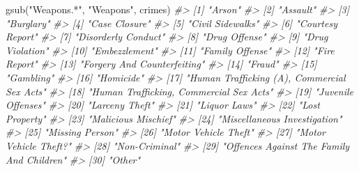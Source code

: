 \documentclass[
  12pt,
]{book}
\newenvironment{Shaded}{\begin{snugshade}}{\end{snugshade}}
\newcommand{\CommentTok}[1]{\textcolor[rgb]{0.37,0.37,0.37}{\textit{#1}}}
\newcommand{\FunctionTok}[1]{\textcolor[rgb]{0,0,0}{#1}}
\newcommand{\NormalTok}[1]{#1}
\newcommand{\StringTok}[1]{\textcolor[rgb]{0.5,0.5,0.5}{#1}}
\begin{document}
\begin{Shaded}
\begin{Highlighting}[]
\FunctionTok{gsub}\NormalTok{(}\StringTok{"Weapons.*"}\NormalTok{, }\StringTok{"Weapons"}\NormalTok{, crimes)}
\CommentTok{\#\textgreater{}  [1] "Arson"                                     }
\CommentTok{\#\textgreater{}  [2] "Assault"                                   }
\CommentTok{\#\textgreater{}  [3] "Burglary"                                  }
\CommentTok{\#\textgreater{}  [4] "Case Closure"                              }
\CommentTok{\#\textgreater{}  [5] "Civil Sidewalks"                           }
\CommentTok{\#\textgreater{}  [6] "Courtesy Report"                           }
\CommentTok{\#\textgreater{}  [7] "Disorderly Conduct"                        }
\CommentTok{\#\textgreater{}  [8] "Drug Offense"                              }
\CommentTok{\#\textgreater{}  [9] "Drug Violation"                            }
\CommentTok{\#\textgreater{} [10] "Embezzlement"                              }
\CommentTok{\#\textgreater{} [11] "Family Offense"                            }
\CommentTok{\#\textgreater{} [12] "Fire Report"                               }
\CommentTok{\#\textgreater{} [13] "Forgery And Counterfeiting"                }
\CommentTok{\#\textgreater{} [14] "Fraud"                                     }
\CommentTok{\#\textgreater{} [15] "Gambling"                                  }
\CommentTok{\#\textgreater{} [16] "Homicide"                                  }
\CommentTok{\#\textgreater{} [17] "Human Trafficking (A), Commercial Sex Acts"}
\CommentTok{\#\textgreater{} [18] "Human Trafficking, Commercial Sex Acts"    }
\CommentTok{\#\textgreater{} [19] "Juvenile Offenses"                         }
\CommentTok{\#\textgreater{} [20] "Larceny Theft"                             }
\CommentTok{\#\textgreater{} [21] "Liquor Laws"                               }
\CommentTok{\#\textgreater{} [22] "Lost Property"                             }
\CommentTok{\#\textgreater{} [23] "Malicious Mischief"                        }
\CommentTok{\#\textgreater{} [24] "Miscellaneous Investigation"               }
\CommentTok{\#\textgreater{} [25] "Missing Person"                            }
\CommentTok{\#\textgreater{} [26] "Motor Vehicle Theft"                       }
\CommentTok{\#\textgreater{} [27] "Motor Vehicle Theft?"                      }
\CommentTok{\#\textgreater{} [28] "Non{-}Criminal"                              }
\CommentTok{\#\textgreater{} [29] "Offences Against The Family And Children"  }
\CommentTok{\#\textgreater{} [30] "Other"                                     }

\end{Highlighting}
\end{Shaded}
\end{document}
